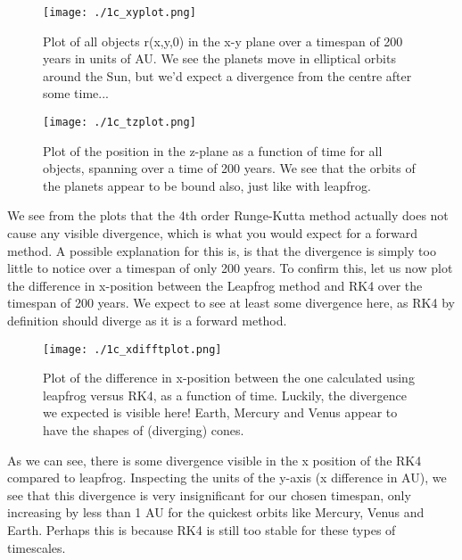\begin{figure}[h!]
  \centering
  \texttt{[image: ./1c\_xyplot.png]}
  \caption{Plot of all objects r(x,y,0) in the x-y plane over a timespan of 200 years in units of AU. We see the planets move in elliptical orbits around the Sun, but we'd expect a divergence from the centre after some time...}
\end{figure}

\begin{figure}[h!]
  \centering
  \texttt{[image: ./1c\_tzplot.png]}
  \caption{Plot of the position in the z-plane as a function of time for all objects, spanning over a time of 200 years. We see that the orbits of the planets appear to be bound also, just like with leapfrog.}
\end{figure}

We see from the plots that the 4th order Runge-Kutta method actually does not cause any visible divergence, which is what you would expect for a forward method. A possible explanation for this is, is that the divergence is simply too little to notice over a timespan of only 200 years. To confirm this, let us now plot the difference in x-position between the Leapfrog method and RK4 over the timespan of 200 years. We expect to see at least some divergence here, as RK4 by definition should diverge as it is a forward method. 

\begin{figure}[h!]
  \centering
  \texttt{[image: ./1c\_xdifftplot.png]}
  \caption{Plot of the difference in x-position between the one calculated using leapfrog versus RK4, as a function of time. Luckily, the divergence we expected is visible here! Earth, Mercury and Venus appear to have the shapes of (diverging) cones.}
\end{figure}

As we can see, there is some divergence visible in the x position of the RK4 compared to leapfrog. Inspecting the units of the y-axis (x difference in AU), we see that this divergence is very insignificant for our chosen timespan, only increasing by less than 1 AU for the quickest orbits like Mercury, Venus and Earth. Perhaps this is because RK4 is still too stable for these types of timescales. 















